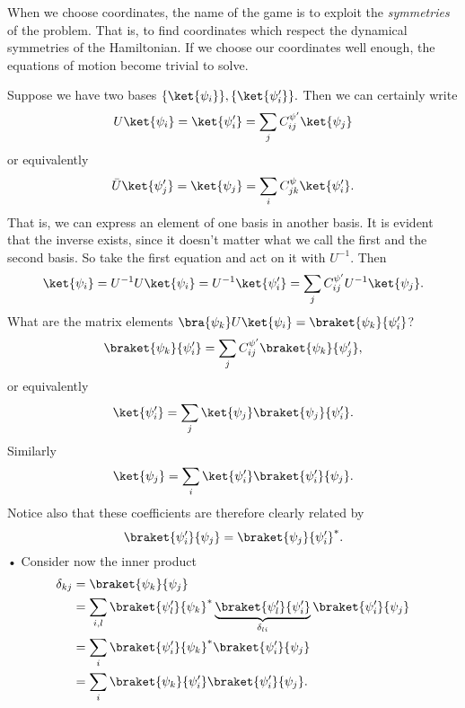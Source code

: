 When we choose coordinates, the name of the game is to exploit the \emph{symmetries} of the problem. That is, to find coordinates which respect the dynamical symmetries of the Hamiltonian. If we choose our coordinates well enough, the equations of motion become trivial to solve.

Suppose we have two bases $\set{\ket{\psi_i}},\set{\ket{\psi_i'}}.$ Then we can certainly write
\begin{equation}
	U\ket{\psi_i} =  \ket{\psi_i'}=\sum_j C_{ij}^{\psi'} \ket{\psi_j}
\end{equation}
or equivalently
\begin{equation}
	\bar U \ket{\psi_j'}=\ket{\psi_j} = \sum_i C_{jk}^\psi \ket{\psi'_i}.
\end{equation}
That is, we can express an element of one basis in another basis. It is evident that the inverse exists, since it doesn't matter what we call the first and the second basis. So take the first equation and act on it with $U^{-1}$. Then
\begin{equation}
	\ket{\psi_i} = U^{-1} U \ket{\psi_i}  = U^{-1} \ket{\psi_i'} = \sum_j C_{ij}^{\psi'} U^{-1} \ket{\psi_j}.
\end{equation}
What are the matrix elements $\bra{\psi_k}U\ket{\psi_i}=\braket{\psi_k}{\psi_i'}$?
\begin{equation}
	\braket{\psi_k}{\psi_i'} = \sum_j C_{ij}^{\psi'}\braket{\psi_k}{\psi_j'},
\end{equation}
or equivalently
\begin{equation}
	\ket{\psi_i'} = \sum_j \ket{\psi_j} \braket{\psi_j}{\psi_i'}.
\end{equation}
Similarly
\begin{equation}
	\ket{\psi_j} = \sum_i \ket{\psi_i'} \braket{\psi_i' }{\psi_j}.
\end{equation}
Notice also that these coefficients are therefore clearly related by 
\begin{equation}
	\braket{\psi_i'}{\psi_j} = \braket{\psi_j}{\psi_i'}^*.
\end{equation}•
Consider now the inner product
\begin{align*}
	\delta_{kj} & = \braket{\psi_k }{\psi_j}\\
		&= \sum_{i,l} \braket{\psi_l'}{\psi_k}^* \underbrace{\braket{\psi_l'}{\psi_i'}}_{\delta_{li}} \braket{\psi_i'}{\psi_j}\\
		&= \sum_i \braket{\psi_i'}{\psi_k}^*\braket{\psi_i'}{\psi_j}\\
		&= \sum_i \braket{\psi_k}{\psi_i'} \braket{\psi_i'}{\psi_j}.
\end{align*}
